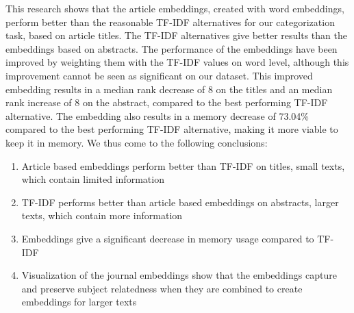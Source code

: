 \documentclass[../../Thesis.tex]{subfiles}
\begin{document}
This research shows that the article embeddings, created with word embeddings, perform better than the reasonable TF-IDF alternatives for our categorization task, based on article titles. The TF-IDF alternatives give better results than the embeddings based on abstracts. The performance of the embeddings have been improved by weighting them with the TF-IDF values on word level, although this improvement cannot be seen as significant on our dataset. This improved embedding results in a median rank decrease of 8 on the titles and an median rank increase of 8 on the abstract, compared to the best performing TF-IDF alternative.  The embedding also results in a memory decrease of 73.04\% compared to the best performing TF-IDF alternative, making it more viable to keep it in memory. We thus come to the following conclusions:
\begin{enumerate}
\item{Article based embeddings perform better than TF-IDF on titles, small texts, which contain limited information}
\item{TF-IDF performs better than article based embeddings on abstracts, larger texts, which contain more information}
\item{Embeddings give a significant decrease in memory usage compared to TF-IDF}
\item{Visualization of the journal embeddings show that the embeddings capture and preserve subject relatedness when they are combined to create embeddings for larger texts}

\end{enumerate}
\end{document}

